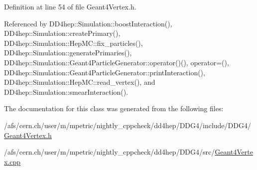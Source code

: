 Definition at line 54 of file Geant4Vertex.h.

Referenced by DD4hep::Simulation::boostInteraction(), DD4hep::Simulation::createPrimary(), DD4hep::Simulation::HepMC::fix\_\-particles(), DD4hep::Simulation::generatePrimaries(), DD4hep::Simulation::Geant4ParticleGenerator::operator()(), operator=(), DD4hep::Simulation::Geant4ParticleGenerator::printInteraction(), DD4hep::Simulation::HepMC::read\_\-vertex(), and DD4hep::Simulation::smearInteraction().

The documentation for this class was generated from the following files:\begin{DoxyCompactItemize}
\item 
/afs/cern.ch/user/m/mpetric/nightly\_\-cppcheck/dd4hep/DDG4/include/DDG4/\hyperlink{_geant4_vertex_8h}{Geant4Vertex.h}\item 
/afs/cern.ch/user/m/mpetric/nightly\_\-cppcheck/dd4hep/DDG4/src/\hyperlink{_geant4_vertex_8cpp}{Geant4Vertex.cpp}\end{DoxyCompactItemize}
